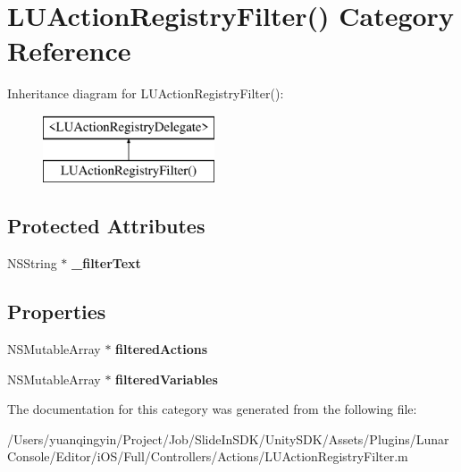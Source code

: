 \hypertarget{category_l_u_action_registry_filter_07_08}{}\section{L\+U\+Action\+Registry\+Filter() Category Reference}
\label{category_l_u_action_registry_filter_07_08}
Inheritance diagram for L\+U\+Action\+Registry\+Filter()\+:\begin{figure}[H]
\begin{center}
\leavevmode
\includegraphics[height=2.000000cm]{category_l_u_action_registry_filter_07_08}
\end{center}
\end{figure}
\subsection*{Protected Attributes}
\begin{DoxyCompactItemize}
\item 
\mbox{\label{category_l_u_action_registry_filter_07_08_ab4a38f4443eab766e0aa6e883f826400}} 
N\+S\+String $\ast$ {\bfseries \+\_\+filter\+Text}
\end{DoxyCompactItemize}
\subsection*{Properties}
\begin{DoxyCompactItemize}
\item 
\mbox{\label{category_l_u_action_registry_filter_07_08_a3341cdf8444158b4386db7d331cefb75}} 
N\+S\+Mutable\+Array $\ast$ {\bfseries filtered\+Actions}
\item 
\mbox{\label{category_l_u_action_registry_filter_07_08_a4d2f0da84f44c68b868df37c122d58ab}} 
N\+S\+Mutable\+Array $\ast$ {\bfseries filtered\+Variables}
\end{DoxyCompactItemize}


The documentation for this category was generated from the following file\+:\begin{DoxyCompactItemize}
\item 
/\+Users/yuanqingyin/\+Project/\+Job/\+Slide\+In\+S\+D\+K/\+Unity\+S\+D\+K/\+Assets/\+Plugins/\+Lunar\+Console/\+Editor/i\+O\+S/\+Full/\+Controllers/\+Actions/L\+U\+Action\+Registry\+Filter.\+m\end{DoxyCompactItemize}
